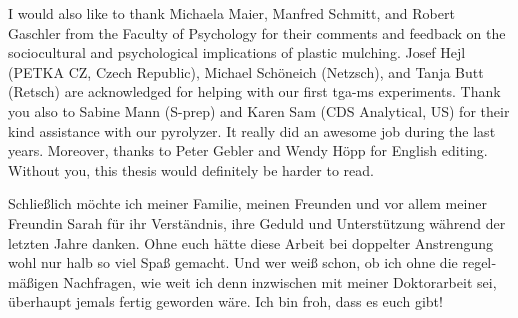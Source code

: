 I would also like to thank Michaela Maier, Manfred Schmitt, and Robert Gaschler from the Faculty of Psychology for their comments and feedback on the sociocultural and psychological implications of plastic mulching. Josef Hejl (PETKA CZ, Czech Republic), Michael Schöneich (Netzsch), and Tanja Butt (Retsch) are acknowledged for helping with our first \acs{tga-ms} experiments. Thank you also to Sabine Mann (S-prep) and Karen Sam (CDS Analytical, US) for their kind assistance with our pyrolyzer. It really did an awesome job during the last years. Moreover, thanks to Peter Gebler and Wendy Höpp for English editing. Without you, this thesis would definitely be harder to read.

\vspace{\baselineskip}

\foreignlanguage{ngerman}{Schließlich möchte ich meiner Familie, meinen Freunden und vor allem meiner Freundin Sarah für ihr Verständnis, ihre Geduld und Unterstützung während der letzten Jahre danken. Ohne euch hätte diese Arbeit bei doppelter Anstrengung wohl nur halb so viel Spaß gemacht. Und wer weiß schon, ob ich ohne die regelmäßigen Nachfragen, wie weit ich denn inzwischen mit meiner Doktorarbeit sei, überhaupt jemals fertig geworden wäre. Ich bin froh, dass es euch gibt!}
